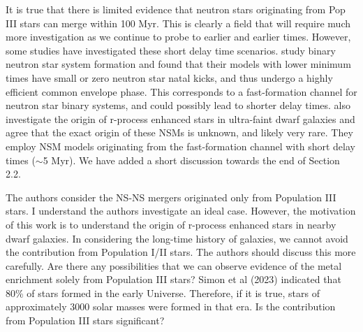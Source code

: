 \documentclass[11pt]{article}
\begin{document}



It is true that there is limited evidence that neutron stars originating from Pop III stars can merge within 100 Myr. This is clearly a field that will require much more investigation as we continue to probe to earlier and earlier times. However, some studies have investigated these short delay time scenarios. \citet{Belczynski18} study binary neutron star system formation and found that their models with lower minimum times have small or zero neutron star natal kicks, and thus undergo a highly efficient common envelope phase. This corresponds to a fast-formation channel for neutron star binary systems, and could possibly lead to shorter delay times. \citet{Jeon21} also investigate the origin of r-process enhanced stars in ultra-faint dwarf galaxies and agree that the exact origin of these NSMs is unknown, and likely very rare. They employ NSM models originating from the fast-formation channel with short delay times ($\sim$5 Myr). We have added a short discussion towards the end of Section 2.2.



\begin{tcolorbox}[colback={lightgray}]   
    The authors consider the NS-NS mergers originated only from Population III stars. I understand the authors investigate an ideal case. However, the motivation of this work is to understand the origin of r-process enhanced stars in nearby dwarf galaxies. In considering the long-time history of galaxies, we cannot avoid the contribution from Population I/II stars. The authors should discuss this more carefully. Are there any possibilities that we can observe evidence of the metal enrichment solely from Population III stars? Simon et al (2023) indicated that 80\% of stars formed in the early Universe. Therefore, if it is true, stars of approximately 3000 solar masses were formed in that era. Is the contribution from Population III stars significant?
\end{tcolorbox}
\end{document}
